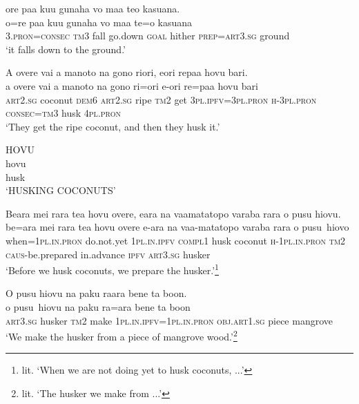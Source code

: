 \ea\label{ex:text01-48}
ore paa kuu gunaha vo maa teo kasuana.\\
\gll o=re	paa	kuu	gunaha	vo	maa	te=o	kasuana\\
     3.\textsc{pron}=\textsc{consec}	\textsc{tm}3	fall	go.down	\textsc{goal}	hither	\textsc{prep}=\textsc{art}3.\textsc{sg}	ground\\
\glt `it falls down to the ground.'
\z

\ea\label{ex:text01-49}
A overe vai a manoto na gono riori, eori repaa hovu bari.\\
\gll a	overe	vai	a	manoto	na	gono	ri=ori	e-ori	re=paa	hovu	bari\\
     \textsc{art}2.\textsc{sg}	coconut	\textsc{dem}6	\textsc{art}2.\textsc{sg}	ripe	\textsc{tm}2	get	3\textsc{pl}.\textsc{ipfv}=3\textsc{pl}.\textsc{pron}	\textsc{h}-3\textsc{pl}.\textsc{pron}	\textsc{consec}=\textsc{tm}3	husk	4\textsc{pl}.\textsc{pron}\\
\glt `They get the ripe coconut, and then they husk it.'
\z

\ea\label{ex:text01-50}
HOVU\\
\gll hovu\\
     husk\\
\glt `HUSKING COCONUTS'
\z

\ea\label{ex:text01-51}
Beara mei rara tea hovu overe, eara na vaamatatopo varaba rara o pusu hiovu.\\
\gll be=ara	mei	rara	tea	hovu	overe	e-ara	na	vaa-matatopo	varaba	rara	o	pusu~hiovo\\
     when=1\textsc{pl}.\textsc{in}.\textsc{pron}	do.not.yet	1\textsc{pl}.\textsc{in}.\textsc{ipfv}	\textsc{compl}1	husk	coconut	\textsc{h}-1\textsc{pl}.\textsc{in}.\textsc{pron}	\textsc{tm}2	\textsc{caus}-be.prepared	in.advance	\textsc{ipfv}	\textsc{art}3.\textsc{sg}	husker\\
\glt `Before we husk coconuts, we prepare the husker.'\footnote{lit. `When we are not doing yet to husk coconuts, ...'}
\z

\ea\label{ex:text01-52}
O pusu hiovu na paku raara bene ta boon.\\
\gll o	pusu~hiovu	na	paku	ra=ara	bene	ta	boon\\
     \textsc{art}3.\textsc{sg}	husker	\textsc{tm}2	make	1\textsc{pl}.\textsc{in}.\textsc{ipfv}=1\textsc{pl}.\textsc{in}.\textsc{pron}	\textsc{obj}.\textsc{art}1.\textsc{sg}	piece	mangrove\\
\glt `We make the husker from a piece of mangrove wood.'\footnote{lit. `The husker we make from ...'}
\z

